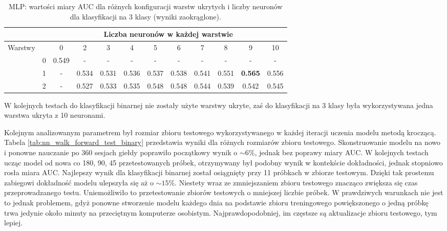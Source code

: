 \documentclass[a4paper, twoside, 11pt, openright]{article}
\begin{document}
\begin{table}[H]
    \centering
    \begin{tabular}{|c|c|c|c|c|c|c|c|c|c|c|c|}
        \hline
         & &  \multicolumn{10}{c|}{Liczba neuronów w każdej warstwie}  \\ \hline
        \multirow{4}{*}{Warstwy} & & 0 & 2 & 3 & 4 & 5 & 6 & 7 & 8 & 9 & 10  \\ \cline{2 - 12}
			& 0 & 0.549 & - & - & - & - & - & - & - & - & - \\ \cline{2 - 12} 
			& 1 & - & 0.534 &  0.531 &  0.536 &  0.537 &  0.538 &  0.541 &  0.551 &  \textbf{0.565} & 0.556 \\ \cline{2 - 12} 
			& 2 & - & 0.527 &   0.533 &   0.535 &   0.548 &   0.548 &   0.544 &   0.539 &   0.542 &   0.545  \\ \cline{2 - 12} \hline

    \end{tabular}
    \caption{MLP: wartości miary AUC dla różnych konfiguracji warstw ukrytych i liczby neuronów dla klasyfikacji na 3 klasy (wyniki zaokrąglone).}
    \label{tab:nn_layers_discrete}
\end{table}

W kolejnych testach do klasyfikacji binarnej nie zostały użyte warstwy ukryte, zaś do klasyfikacji na 3 klasy była wykorzystywana jedna warstwa ukryta z 10 neuronami.

\bigskip

Kolejnym analizowanym parametrem był rozmiar zbioru testowego wykorzystywanego w każdej iteracji uczenia modelu metodą kroczącą. Tabela \ref{tab:nn_walk_forward_test_binary} przedstawia wyniki dla różnych rozmiarów zbioru testowego. Skonstruowanie modelu na nowo i ponowne nauczanie po 360 sesjach giełdy poprawiło początkowy wynik o $\sim 6\%$, jednak bez poprawy miary AUC. W kolejnych testach ucząc model od nowa co 180, 90, 45 przetestowanych próbek, otrzymywany był podobny wynik w kontekście dokładności, jednak stopniowo rosła miara AUC. Najlepszy wynik dla klasyfikacji binarnej został osiągnięty przy 11 próbkach w zbiorze testowym. Dzięki tak prostemu zabiegowi dokładność modelu ulepszyła się aż o $\sim 15\%$. Niestety wraz ze zmniejszaniem zbioru testowego znacząco zwiększa się czas przeprowadzanego testu. Uniemożliwiło to przetestowanie zbiorów testowych o mniejszej liczbie próbek. W prawdziwych warunkach nie jest to jednak problemem, gdyż ponowne stworzenie modelu każdego dnia na podstawie zbioru treningowego powiększonego o jedną próbkę trwa jedynie około minuty na przeciętnym komputerze osobistym. Najprawdopodobniej, im częstsze są aktualizacje zbioru testowego, tym lepiej.
\end{document}
